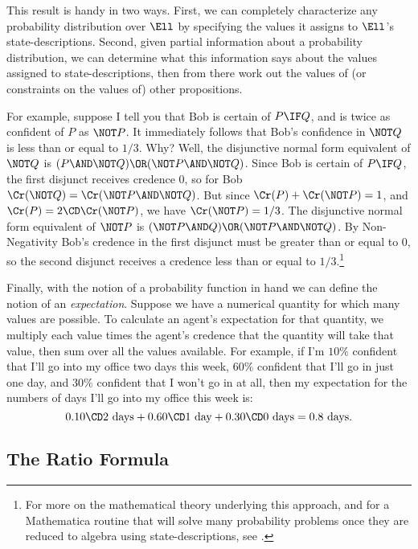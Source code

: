 This result is handy in two ways. First, we can completely characterize any probability distribution over $\Ell$ by specifying the values it assigns to $\Ell$'s state-descriptions. Second, given partial information about a probability distribution, we can determine what this information says about the values assigned to state-descriptions, then from there work out the values of (or constraints on the values of) other propositions.

For example, suppose I tell you that Bob is certain of $P \IF Q$, and is twice as confident of $P$ as $\NOT P$. It immediately follows that Bob's confidence in $\NOT Q$ is less than or equal to $1/3$. Why? Well, the disjunctive normal form equivalent of $\NOT Q$ is $(P \AND \NOT Q) \OR (\NOT P \AND \NOT Q)$. Since Bob is certain of $P \IF Q$, the first disjunct receives credence $0$, so for Bob $\Cr(\NOT Q)=\Cr(\NOT P \AND \NOT Q)$. But since $\Cr(P)+\Cr(\NOT P)=1$, and $\Cr(P)=2 \CD \Cr(\NOT P)$, we have $\Cr(\NOT P)=1/3$. The disjunctive normal form equivalent of $\NOT P$ is $(\NOT P \AND Q) \OR (\NOT P \AND \NOT Q)$. By Non-Negativity Bob's credence in the first disjunct must be greater than or equal to $0$, so the second disjunct receives a credence less than or equal to $1/3$.\footnote
{For more on the mathematical theory underlying this approach, and for a Mathematica routine that will solve many probability problems once they are reduced to algebra using state-descriptions, see \citet{FitelsonDecision}.}

Finally, with the notion of a probability function in hand we can define the notion of an \textit{expectation}. Suppose we have a numerical quantity for which many values are possible. To calculate an agent's expectation for that quantity, we multiply each value times the agent's credence that the quantity will take that value, then sum over all the values available. For example, if I'm $10\%$ confident that I'll go into my office two days this week, $60\%$ confident that I'll go in just one day, and $30\%$ confident that I won't go in at all, then my expectation for the numbers of days I'll go into my office this week is:
\begin{equation}
0.10 \CD 2 \text{ days}+ 0.60 \CD 1 \text{ day} + 0.30 \CD 0 \text{ days}=0.8 \text{ days.}
\end{equation}



\subsection{The Ratio Formula}\label{ss:Ratio}

